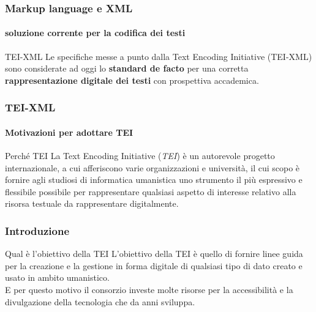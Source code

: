 \begin{frame}
	\frametitle{Markup language e XML}
	\framesubtitle{soluzione corrente per la codifica dei testi}
	\addtocounter{nframe}{1}

	\begin{block}{TEI-XML}
		Le specifiche messe a punto dalla Text Encoding Initiative (TEI-XML) sono considerate ad oggi lo \textbf{standard de facto} per una corretta \textbf{rappresentazione digitale dei testi} con prospettiva accademica.
	\end{block}

\end{frame}

\begin{frame}
	\frametitle{TEI-XML}
	\framesubtitle{Motivazioni per adottare TEI}
	\addtocounter{nframe}{1}

	\begin{block}{Perché TEI}
		La Text Encoding Initiative (\textit{TEI}) è un autorevole progetto internazionale, a cui afferiscono varie organizzazioni e università, il cui scopo è fornire agli studiosi di informatica umanistica uno strumento il più espressivo e flessibile possibile per rappresentare qualsiasi aspetto di interesse relativo alla risorsa testuale da rappresentare digitalmente.
	\end{block}

\end{frame}

\begin{frame}
	\frametitle{Introduzione}
	\addtocounter{nframe}{1}
    
    \begin{block}{Qual è l'obiettivo della TEI}
        L'obiettivo della TEI è quello di fornire linee guida per la creazione e la gestione in forma digitale di qualsiasi tipo di dato creato e usato in ambito umanistico.
        \\ E per questo motivo il consorzio investe molte risorse per la accessibilità e la divulgazione della tecnologia che da anni sviluppa.
    \end{block}
    
\end{frame}

